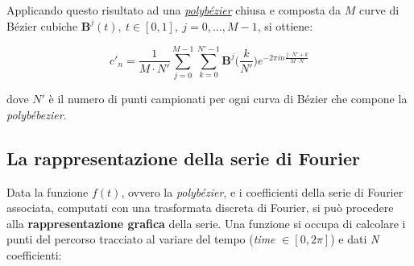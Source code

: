 \documentclass[
]{book}
\begin{document}
Applicando questo risultato ad una \protect\hyperlink{polbezier}{\emph{polybézier}} chiusa e composta da \(M\) curve di Bézier cubiche \(\mathbf{B}^j(t), \ t \in [0,1], \ j=0,...,M-1\), si ottiene:

\begin{equation}
    c'_n=\frac{1}{M\cdot N'}\sum_{j=0}^{M-1}\sum_{k=0}^{N'-1}\mathbf{B}^{j}\bigg(\frac{k}{N'}\bigg)e^{-2\pi in \textstyle \frac{j\cdot N'+ k}{M\cdot N}}
    \label{eq:beziercoeff}
\end{equation}

dove \(N'\) è il numero di punti campionati per ogni curva di Bézier che compone la \emph{polybébezier}.

\hypertarget{rapprserie}{%
\subsection{La rappresentazione della serie di Fourier}\label{rapprserie}}

Data la funzione \(f(t)\), ovvero la \emph{polybézier}, e i coefficienti della serie di Fourier associata, computati con una trasformata discreta di Fourier, si può procedere alla \textbf{rappresentazione grafica} della serie. Una funzione si occupa di calcolare i punti del percorso tracciato al variare del tempo (\emph{time} \(\in [0,2\pi]\)) e dati \emph{N} coefficienti:
\end{document}
